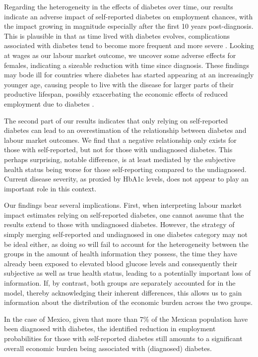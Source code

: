 Regarding the heterogeneity in the effects of diabetes over time, our results indicate an adverse impact of self-reported diabetes on employment chances, with the impact growing in magnitude especially after the first 10 years post-diagnosis. This is plausible in that as time lived with diabetes evolves, complications associated with diabetes tend to become more frequent and more severe \parencite{Adler2003}. Looking at wages as our labour market outcome, we uncover some adverse effects for females, indicating a sizeable reduction with time since diagnosis. These findings may bode ill for countries where diabetes has started appearing at an increasingly younger age, causing people to live with the disease for larger parts of their productive lifespan, possibly exacerbating the economic effects of reduced employment due to diabetes \parencite{Hu2011,Villalpando2010}.

The second part of our results indicates that only relying on self-reported diabetes can lead to an overestimation of the relationship between diabetes and labour market outcomes. We find that a negative relationship only exists for those with self-reported, but not for those with undiagnosed diabetes. This perhaps surprising, notable difference, is at least mediated by the subjective health status being worse for those self-reporting compared to the undiagnosed. Current disease severity, as proxied by \ac{HbA1c} levels, does not appear to play an important role in this context.

Our findings bear several implications. First, when interpreting labour market impact estimates relying on self-reported diabetes, one cannot assume that the results extend to those with undiagnosed diabetes. However, the strategy of simply merging self-reported and undiagnosed in one diabetes category may not be ideal either, as doing so will fail to account for the heterogeneity between the groups in the amount of health information they possess, the time they have already been exposed to elevated blood glucose levels and consequently their subjective as well as true health status, leading to a potentially important loss of information. If, by contrast, both groups are separately accounted for in the model, thereby acknowledging their inherent differences, this allows us to gain information about the distribution of the economic burden across the two groups. 

In the case of Mexico, given that more than 7\% of the Mexican population have been diagnosed with diabetes, the identified reduction in employment probabilities for those with self-reported diabetes still amounts to a significant overall economic burden being associated with (diagnosed) diabetes.

